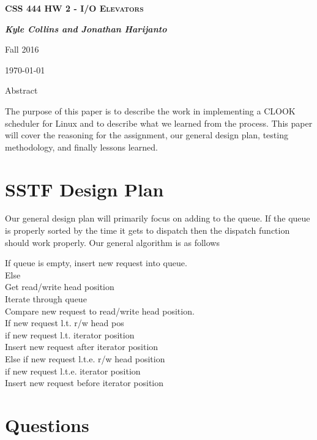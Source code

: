 \documentclass[letterpaper,10pt,draftclsnofoot,titlepage,onecolumn]{IEEEtran}
\begin{document}
	
	\begin{titlepage}
		\centering
		{\scshape\LARGE \textbf{CSS 444 HW 2 - I/O Elevators}\par}
		{\LARGE\itshape \textbf{Kyle Collins and Jonathan Harijanto}\par}
		{\LARGE Fall 2016\par}
		{\LARGE \today\par}
		
		{\LARGE Abstract\par}
		The purpose of this paper is to describe the work in implementing a CLOOK scheduler for Linux and to describe what we learned from the process. This paper will cover the reasoning for the assignment, our general design plan, testing methodology, and finally lessons learned. 
		
	\end{titlepage}
	
	\clearpage
	\tableofcontents
	
	\clearpage
	\section{SSTF Design Plan}
	
	Our general design plan will primarily focus on adding to the queue. If the queue is properly sorted by the time it gets to dispatch then the dispatch function should work properly. Our general algorithm is as follows
	
	If queue is empty, insert new request into queue.\\
	Else\\
		Get read/write head position\\
		Iterate through queue\\
		Compare new request to read/write head position.\\
		If new request l.t. r/w head pos\\
			if new request l.t. iterator position\\
				 Insert new request after iterator position\\
		Else if new request l.t.e. r/w head position\\
			if new request l.t.e. iterator position\\
				Insert new request before iterator position\\

	\clearpage
	\section{Questions}
	
\end{document}
